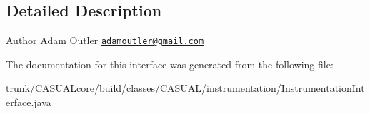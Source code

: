 \subsection{Detailed Description}
\begin{DoxyAuthor}{Author}
Adam Outler \href{mailto:adamoutler@gmail.com}{\tt adamoutler@gmail.\-com} 
\end{DoxyAuthor}


The documentation for this interface was generated from the following file\-:\begin{DoxyCompactItemize}
\item 
trunk/\-C\-A\-S\-U\-A\-Lcore/build/classes/\-C\-A\-S\-U\-A\-L/instrumentation/Instrumentation\-Interface.\-java\end{DoxyCompactItemize}
